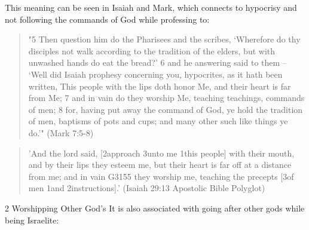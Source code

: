 \documentclass[11pt]{article}
\begin{document}
This meaning can be seen in Isaiah and Mark, which connects to hypocrisy and not following the commands of God while professing to:
\begin{quote}
"5 Then question him do the Pharisees and the scribes, `Wherefore do thy disciples not walk according to the tradition of the elders, but with unwashed hands do eat the bread?'
6 and he answering said to them -- `Well did Isaiah prophesy concerning you, hypocrites, as it hath been written, This people with the lips doth honor Me, and their heart is far from Me;
7 and in vain do they worship Me, teaching teachings, commands of men;
8 for, having put away the command of God, ye hold the tradition of men, baptisms of pots and cups; and many other such like things ye do.'"
(Mark 7:5-8)
\end{quote}
\begin{quote}
'And the lord said, [2approach 3unto me 1this people] with their mouth, and by their lips they esteem me, but their heart is far off at a distance from me; and in vain G3155 they worship me, teaching the precepts [3of men 1and 2instructions].'
(Isaiah 29:13 Apostolic Bible Polyglot)
\end{quote}

{\Large 2 Worshipping Other God's}\newline
It is also associated with going after other gods while being Israelite:
\end{document}
